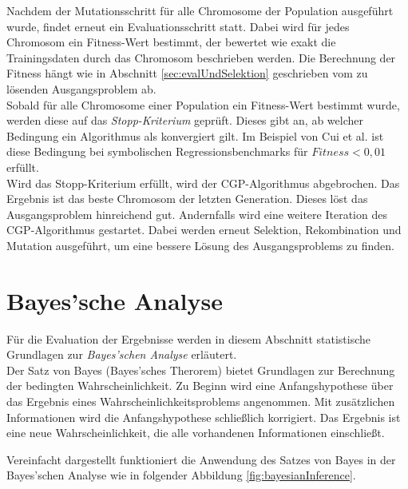Nachdem der Mutationsschritt für alle Chromosome der Population ausgeführt wurde, findet erneut ein Evaluationsschritt statt.
Dabei wird für jedes Chromosom ein Fitness-Wert bestimmt, der bewertet wie exakt die Trainingsdaten durch das Chromosom beschrieben werden. \cite{milad_taleby_ahvanooey_survey_2019}
Die Berechnung der Fitness hängt wie in Abschnitt \ref{sec:evalUndSelektion} geschrieben vom zu lösenden Ausgangsproblem ab.\\
Sobald für alle Chromosome einer Population ein Fitness-Wert bestimmt wurde, werden diese auf das \emph{Stopp-Kriterium} geprüft.
Dieses gibt an, ab welcher Bedingung ein Algorithmus als konvergiert gilt.
Im Beispiel von Cui et al. ist diese Bedingung bei symbolischen Regressionsbenchmarks für $Fitness < 0,01$ erfüllt. \cite{affenzeller_positional_2024}\\
Wird das Stopp-Kriterium erfüllt, wird der CGP-Algorithmus abgebrochen.
Das Ergebnis ist das beste Chromosom der letzten Generation.
Dieses löst das Ausgangsproblem hinreichend gut.
Andernfalls wird eine weitere Iteration des CGP-Algorithmus gestartet. 
Dabei werden erneut Selektion, Rekombination und Mutation ausgeführt, um eine bessere Lösung des Ausgangsproblems zu finden.

\section{Bayes'sche Analyse}
\label{sec:bayesian}

Für die Evaluation der Ergebnisse werden in diesem Abschnitt statistische Grundlagen zur \emph{Bayes'schen Analyse} erläutert.\\
Der Satz von Bayes (Bayes'sches Therorem) bietet Grundlagen zur Berechnung der bedingten Wahrscheinlichkeit.
Zu Beginn wird eine Anfangshypothese über das Ergebnis eines Wahrscheinlichkeitsproblems angenommen.
Mit zusätzlichen Informationen wird die Anfangshypothese schließlich korrigiert.
Das Ergebnis ist eine neue Wahrscheinlichkeit, die alle vorhandenen Informationen einschließt. \cite{peyrolon_definition_2020}

Vereinfacht dargestellt funktioniert die Anwendung des Satzes von Bayes in der Bayes'schen Analyse wie in folgender Abbildung \ref{fig:bayesianInference}.

